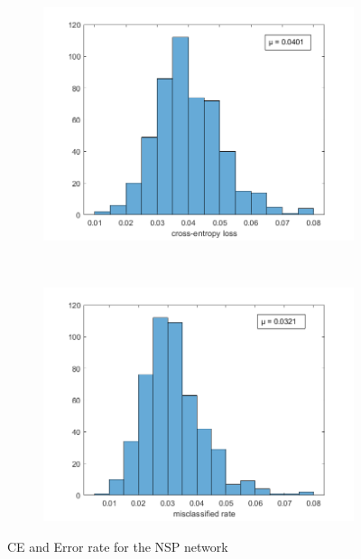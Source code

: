 \documentclass[11pt,a4paper]{article}
\begin{document}
\begin{figure}[htb]
  \centering
  \begin{subfigure}[b]{0.45\textwidth}
    \centering
    \includegraphics[width=\textwidth]{figures/NSP/ce_histogram_500.png}
  \end{subfigure}
  ~
  \begin{subfigure}[b]{0.45\textwidth}
    \centering
    \includegraphics[width=\textwidth]{figures/NSP/misclasified_histogram_500.png}
  \end{subfigure}
  \caption{CE and Error rate for the NSP network}
  \label{fig:NSP_HIST}
\end{figure}
\end{document}
